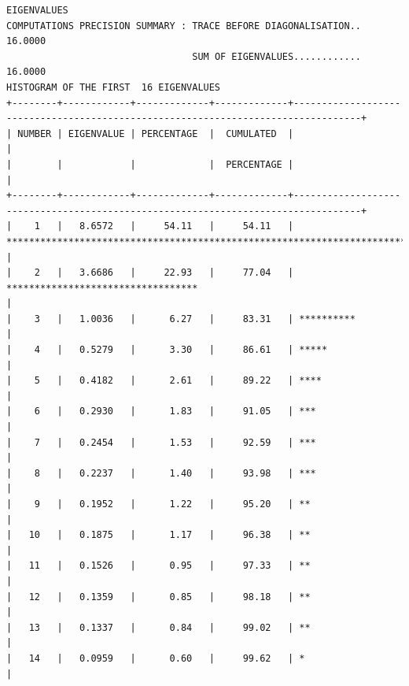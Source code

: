 \documentclass[a4paper,10pt,twocolumn]{article}
\begin{document}
\begin{landscape}
\begin{verbatim}
EIGENVALUES
COMPUTATIONS PRECISION SUMMARY : TRACE BEFORE DIAGONALISATION..  16.0000
                                 SUM OF EIGENVALUES............  16.0000
HISTOGRAM OF THE FIRST  16 EIGENVALUES
+--------+------------+-------------+-------------+----------------------------------------------------------------------------------+
| NUMBER | EIGENVALUE | PERCENTAGE  |  CUMULATED  |                                                                                  |
|        |            |             |  PERCENTAGE |                                                                                  |
+--------+------------+-------------+-------------+----------------------------------------------------------------------------------+
|    1   |   8.6572   |     54.11   |     54.11   | ******************************************************************************** |
|    2   |   3.6686   |     22.93   |     77.04   | **********************************                                               |
|    3   |   1.0036   |      6.27   |     83.31   | **********                                                                       |
|    4   |   0.5279   |      3.30   |     86.61   | *****                                                                            |
|    5   |   0.4182   |      2.61   |     89.22   | ****                                                                             |
|    6   |   0.2930   |      1.83   |     91.05   | ***                                                                              |
|    7   |   0.2454   |      1.53   |     92.59   | ***                                                                              |
|    8   |   0.2237   |      1.40   |     93.98   | ***                                                                              |
|    9   |   0.1952   |      1.22   |     95.20   | **                                                                               |
|   10   |   0.1875   |      1.17   |     96.38   | **                                                                               |
|   11   |   0.1526   |      0.95   |     97.33   | **                                                                               |
|   12   |   0.1359   |      0.85   |     98.18   | **                                                                               |
|   13   |   0.1337   |      0.84   |     99.02   | **                                                                               |
|   14   |   0.0959   |      0.60   |     99.62   | *                                                                                |

\end{verbatim}
\end{landscape}
\end{document}
